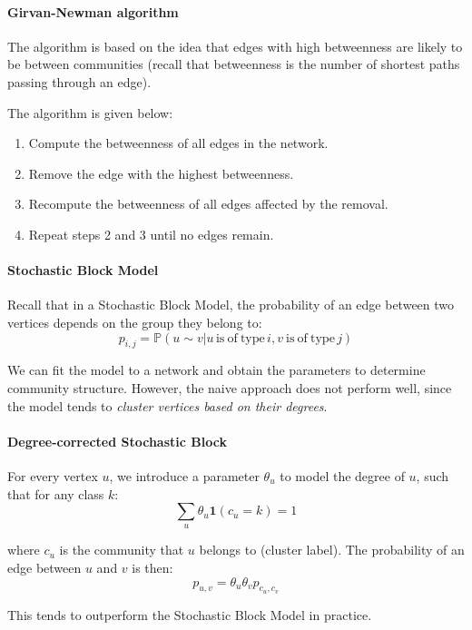 \documentclass{article}
\begin{document}
\paragraph{Girvan-Newman algorithm} The algorithm is based on the idea that edges with high betweenness are likely to be between communities (recall that betweenness is the number of shortest paths passing through an edge).

The algorithm is given below:
\begin{enumerate}
    \item Compute the betweenness of all edges in the network.
    \item Remove the edge with the highest betweenness.
    \item Recompute the betweenness of all edges affected by the removal.
    \item Repeat steps 2 and 3 until no edges remain.
\end{enumerate}

\paragraph{Stochastic Block Model}
Recall that in a Stochastic Block Model, the probability of an edge between two vertices depends on the group they belong to: 
\begin{equation*}
    p_{i,j}=\mathbb{P}(u\sim v|u\,\mathrm{is~of~type}\,i,v{\mathrm{~is~of~type}}\,j)
\end{equation*}


We can fit the model to a network and obtain the parameters to determine community structure. However, the naive approach does not perform well, since the model tends to \textit{cluster vertices based on their degrees}.

\paragraph{Degree-corrected Stochastic Block} For every vertex $u$, we introduce a parameter $\theta_u$ to model the degree of $u$, such that for any class $k$:
\begin{equation*}
    \sum_{u}\theta_{u}\mathbf{1}(c_{u}=k)=1
\end{equation*}

where $c_u$ is the community that $u$ belongs to (cluster label). The probability of an edge between $u$ and $v$ is then:
\begin{equation*}
    p_{u,v}=\theta_{u}\theta_{v}p_{c_{u},c_{v}}
\end{equation*}

This tends to outperform the Stochastic Block Model in practice.  

\newpage


\end{document}
